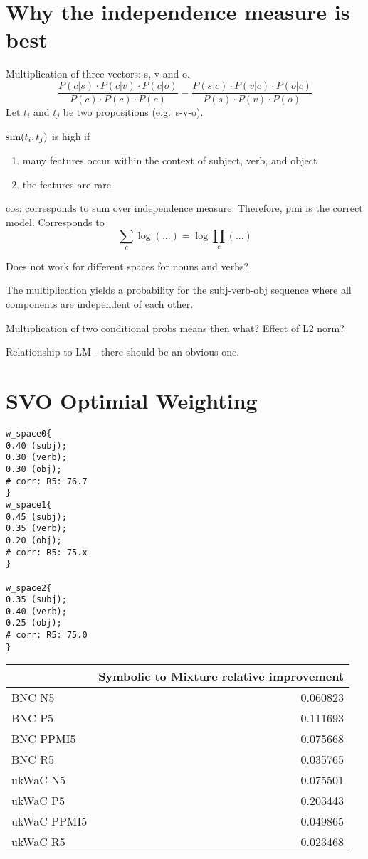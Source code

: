 \section{Why the independence measure is best}

Multiplication of three vectors: s, v and o.
\[
\frac{
P(c|s) \cdot P(c|v) \cdot P(c|o)}{
P(c) \cdot P(c) \cdot P(c)} =
\frac{
P(s|c) \cdot P(v|c) \cdot P(o|c)
}{
P(s) \cdot P(v) \cdot P(o)
}
\]
Let $t_i$ and $t_j$ be two propositions
(e.g.~s-v-o).

$\textmd{sim}(t_i,t_j)$ is high if
\begin{enumerate}
\item many features occur within the context of subject, verb, and object
\item the features are rare
\end{enumerate}

cos: corresponds to sum over independence measure.
Therefore, pmi is the correct model.
Corresponds to
\[
\sum_c \log(...) = \log \prod_c(...)
\]



Does not work for different
spaces for nouns and verbs?

The multiplication yields a probability
for the subj-verb-obj sequence where all
components are independent of each other.

Multiplication of two conditional probs means then what?
Effect of L2 norm?


Relationship to LM - there should be an obvious one.

\section{SVO Optimial Weighting}

\begin{verbatim}
w_space0{
0.40 (subj);
0.30 (verb);
0.30 (obj);
# corr: R5: 76.7
}
w_space1{
0.45 (subj);
0.35 (verb);
0.20 (obj);
# corr: R5: 75.x
}

w_space2{
0.35 (subj);
0.40 (verb);
0.25 (obj);
# corr: R5: 75.0
}
\end{verbatim}


\begin{tabular}{lr}
\toprule
{} &         Symbolic to Mixture relative improvement \\
\midrule
BNC N5      &  0.060823 \\
BNC P5      &  0.111693 \\
BNC PPMI5   &  0.075668 \\
BNC R5      &  0.035765 \\
ukWaC N5    &  0.075501 \\
ukWaC P5    &  0.203443 \\
ukWaC PPMI5 &  0.049865 \\
ukWaC R5    &  0.023468 \\
\bottomrule
\end{tabular}

